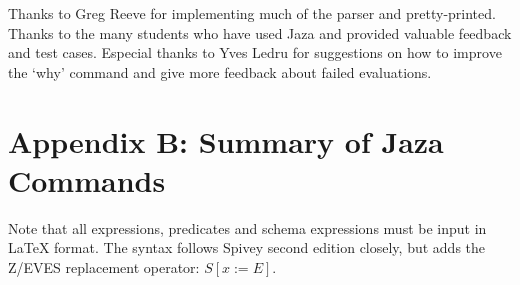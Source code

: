 \documentclass[11pt]{article}
\newcommand{\Jaza}{Jaza}
\begin{document}
Thanks to Greg Reeve for implementing much of the parser and
pretty-printed.  Thanks to the many students who have used Jaza
and provided valuable feedback and test cases.  Especial thanks
to Yves Ledru for suggestions on how to improve the `why' command
and give more feedback about failed evaluations.




\appendix

\section*{Appendix B: Summary of {\Jaza} Commands}

Note that all expressions, predicates and schema expressions
must be input in {\LaTeX} format.  The syntax follows Spivey
second edition closely, but adds the Z/EVES replacement
operator: $S[x := E]$.  
\end{document}

